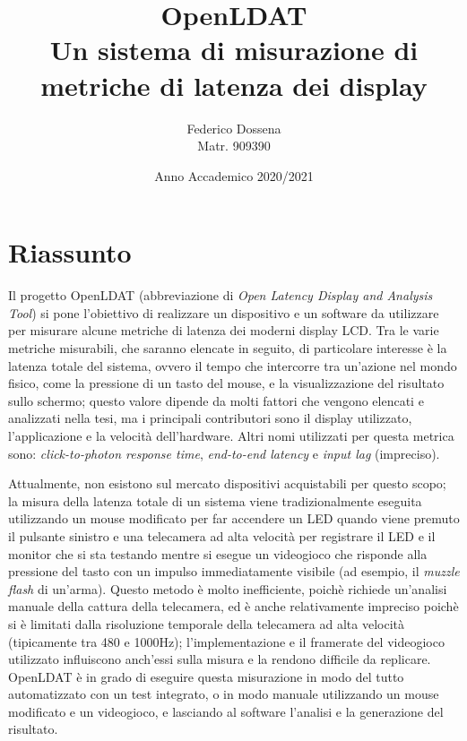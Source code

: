 \documentclass[a4paper]{article}
\title{OpenLDAT\\Un sistema di misurazione di metriche di latenza dei display}
\author{Federico Dossena\\Matr. 909390}
\date{Anno Accademico 2020/2021}
\begin{document}
\maketitle

\sloppy
\setlength{\parskip}{8pt}
\setlength{\parindent}{0pt}
\section*{Riassunto}
Il progetto OpenLDAT (abbreviazione di \textit{Open Latency Display and Analysis Tool}) si pone l'obiettivo di realizzare un dispositivo e un software da utilizzare per misurare alcune metriche di latenza dei moderni display LCD. Tra le varie metriche misurabili, che saranno elencate in seguito, di particolare interesse è la latenza totale del sistema, ovvero il tempo che intercorre tra un'azione nel mondo fisico, come la pressione di un tasto del mouse, e la visualizzazione del risultato sullo schermo; questo valore dipende da molti fattori che vengono elencati e analizzati nella tesi, ma i principali contributori sono il display utilizzato, l'applicazione e la velocità dell'hardware. Altri nomi utilizzati per questa metrica sono: \textit{click-to-photon response time}, \textit{end-to-end latency} e \textit{input lag} (impreciso).

Attualmente, non esistono sul mercato dispositivi acquistabili per questo scopo; la misura della latenza totale di un sistema viene tradizionalmente eseguita utilizzando un mouse modificato per far accendere un LED quando viene premuto il pulsante sinistro e una telecamera ad alta velocità per registrare il LED e il monitor che si sta testando mentre si esegue un videogioco che risponde alla pressione del tasto con un impulso immediatamente visibile (ad esempio, il \textit{muzzle flash} di un'arma). Questo metodo è molto inefficiente, poichè richiede un'analisi manuale della cattura della telecamera, ed è anche relativamente impreciso poichè si è limitati dalla risoluzione temporale della telecamera ad alta velocità (tipicamente tra 480 e 1000Hz); l'implementazione e il framerate del videogioco utilizzato influiscono anch'essi sulla misura e la rendono difficile da replicare. OpenLDAT è in grado di eseguire questa misurazione in modo del tutto automatizzato con un test integrato, o in modo manuale utilizzando un mouse modificato e un videogioco, e lasciando al software l'analisi e la generazione del risultato.
\end{document}
